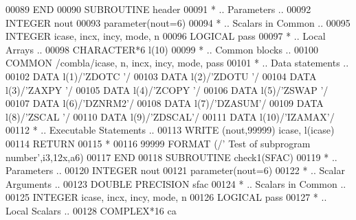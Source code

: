 \begin{DoxyCode}
00089 \textcolor{keyword}{      END}
00090 \textcolor{keyword}{      SUBROUTINE }header
00091 \textcolor{comment}{*     .. Parameters ..}
00092       \textcolor{keywordtype}{INTEGER}          nout
00093       parameter(nout=6)
00094 \textcolor{comment}{*     .. Scalars in Common ..}
00095       \textcolor{keywordtype}{INTEGER}          icase, incx, incy, mode, n
00096       \textcolor{keywordtype}{LOGICAL}          pass
00097 \textcolor{comment}{*     .. Local Arrays ..}
00098       \textcolor{keywordtype}{CHARACTER*6}      l(10)
00099 \textcolor{comment}{*     .. Common blocks ..}
00100       \textcolor{keyword}{COMMON}           /combla/icase, n, incx, incy, mode, pass
00101 \textcolor{comment}{*     .. Data statements ..}
00102       \textcolor{keyword}{DATA}             l(1)/\textcolor{stringliteral}{'ZDOTC '}/
00103       \textcolor{keyword}{DATA}             l(2)/\textcolor{stringliteral}{'ZDOTU '}/
00104       \textcolor{keyword}{DATA}             l(3)/\textcolor{stringliteral}{'ZAXPY '}/
00105       \textcolor{keyword}{DATA}             l(4)/\textcolor{stringliteral}{'ZCOPY '}/
00106       \textcolor{keyword}{DATA}             l(5)/\textcolor{stringliteral}{'ZSWAP '}/
00107       \textcolor{keyword}{DATA}             l(6)/\textcolor{stringliteral}{'DZNRM2'}/
00108       \textcolor{keyword}{DATA}             l(7)/\textcolor{stringliteral}{'DZASUM'}/
00109       \textcolor{keyword}{DATA}             l(8)/\textcolor{stringliteral}{'ZSCAL '}/
00110       \textcolor{keyword}{DATA}             l(9)/\textcolor{stringliteral}{'ZDSCAL'}/
00111       \textcolor{keyword}{DATA}             l(10)/\textcolor{stringliteral}{'IZAMAX'}/
00112 \textcolor{comment}{*     .. Executable Statements ..}
00113       \textcolor{keyword}{WRITE} (nout,99999) icase, l(icase)
00114       \textcolor{keywordflow}{RETURN}
00115 \textcolor{comment}{*}
00116 99999 \textcolor{keyword}{FORMAT} (/\textcolor{stringliteral}{' Test of subprogram number'},i3,12x,a6)
00117 \textcolor{keyword}{      END}
00118 \textcolor{keyword}{      SUBROUTINE }check1(SFAC)
00119 \textcolor{comment}{*     .. Parameters ..}
00120       \textcolor{keywordtype}{INTEGER}           nout
00121       parameter(nout=6)
00122 \textcolor{comment}{*     .. Scalar Arguments ..}
00123       \textcolor{keywordtype}{DOUBLE PRECISION}  sfac
00124 \textcolor{comment}{*     .. Scalars in Common ..}
00125       \textcolor{keywordtype}{INTEGER}           icase, incx, incy, mode, n
00126       \textcolor{keywordtype}{LOGICAL}           pass
00127 \textcolor{comment}{*     .. Local Scalars ..}
00128       \textcolor{keywordtype}{COMPLEX*16}        ca

\end{DoxyCode}
